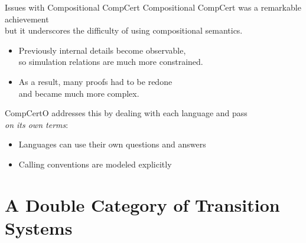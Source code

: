 \documentclass[aspectratio=1610,12pt]{beamer}
\begin{document}
\begin{frame}{Issues with Compositional CompCert} %
  Compositional CompCert was a remarkable achievement \\
  but it underscores the difficulty of using compositional semantics.
  \begin{itemize}
  \item
  Previously internal details become observable, \\
  so simulation relations are much more constrained.
  \item
  As a result,
  many proofs had to be redone \\
  and became much more complex.
  \end{itemize}

  \pause\vfill
  CompCertO addresses this
  by dealing with each language and pass \\
  \emph{on its own terms}:
  \begin{itemize}
    \item Languages can use their own questions and answers
    \item Calling conventions are modeled explicitly
  \end{itemize}
\end{frame}

\section{A Double Category of Transition Systems}
\end{document}
